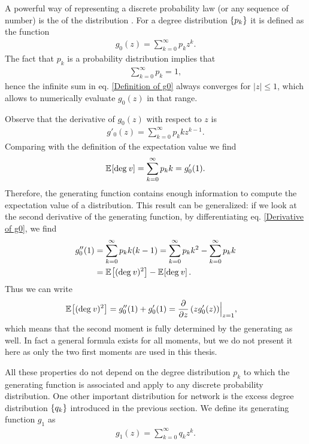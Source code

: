 \documentclass[
11pt, %
american, %
singlespacing, %
final, %
nolistspacing, %
liststotoc, %
headsepline, %
]{MastersDoctoralThesis} %
\begin{document}
A powerful way of representing a discrete probability law (or any sequence of number) is the  of the distribution \cite{wilf2005generatingfunctionology}. For a degree distribution $\{p_k\}$ it is defined as the function
\begin{align}
	g_0(z) = \sum_{k=0}^\infty p_k z^k. \label{Definition of g0}
\end{align}
The fact that $p_k$ is a probability distribution implies that
\begin{align}
	\sum_{k = 0}^\infty p_k = 1, \label{Normalization of pk}
\end{align}
hence the infinite sum in eq. \eqref{Definition of g0} always converges for $\rvert z \rvert \leq 1$, which allows to numerically evaluate $g_0(z)$ in that range.

Observe that the derivative of $g_0(z)$ with respect to $z$ is
\begin{align}
	g'_0(z) = \sum_{k=0}^\infty p_k k z^{k-1}. \label{Derivative of g0}
\end{align}
Comparing with the definition of the expectation value we find
\begin{align}
	\mathbb{E}_{}\!\left[ \mathrm{deg}_{}\, v \right] = \sum_{k=0}^\infty p_k k = g'_0(1). \label{Expectation value as g'0(1)}
\end{align}
Therefore, the generating function contains enough information to compute the expectation value of a distribution. This result can be generalized: if we look at the second derivative of the generating function, by differentiating eq. \eqref{Derivative of g0}, we find
\begin{align}
	g''_0(1) &= \sum_{k=0}^\infty p_k k (k - 1) = \sum_{k=0}^\infty p_k k^2 - \sum_{k=0}^\infty p_k k \\
		&= \mathbb{E}_{}\!\left[ (\mathrm{deg}_{}\, v)^2 \right] - \mathbb{E}_{}\!\left[ \mathrm{deg}_{}\, v \right]. \label{Second derivative of g0}
\end{align}
Thus we can write
\begin{align}
	\mathbb{E}_{}\!\left[ (\mathrm{deg}_{}\, v)^2 \right] &= g''_0(1) + g'_0(1) = \frac{\partial}{\partial z}\left(z g'_0(z)\right)\Bigr|_{z = 1},  \label{Second moment as derivatives of g0}
\end{align}
which means that the second moment is fully determined by the generating as well. In fact a general formula exists for all moments, but we do not present it here as only the two first moments are used in this thesis.

All these properties do not depend on the degree distribution $p_k$ to which the generating function is associated and apply to any discrete probability distribution. One other important distribution for network is the excess degree distribution $\{q_k\}$ introduced in the previous section. We define its generating function $g_1$ as
\begin{align}
	g_1(z) = \sum_{k=0}^\infty q_k z^k. \label{Definition of g1}
\end{align}
\end{document}
